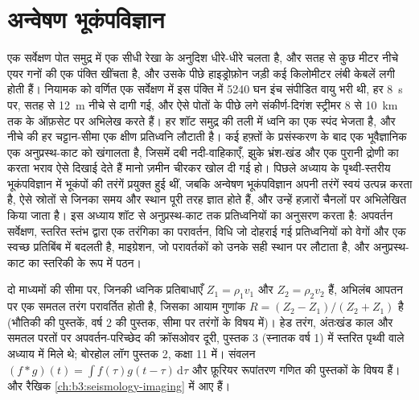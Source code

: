 \chapter{अन्वेषण भूकंपविज्ञान}\label{ch:b3:exploration-seismology}

एक सर्वेक्षण पोत समुद्र में एक सीधी रेखा के अनुदिश धीरे-धीरे चलता है, और सतह से
कुछ मीटर नीचे एयर गनों की एक पंक्ति खींचता है, और उसके पीछे
हाइड्रोफ़ोन जड़ी कई किलोमीटर लंबी केबलें लगी होती हैं।
नियामक को वर्णित एक सर्वेक्षण में इस पंक्ति में \num{5240} घन इंच संपीडित वायु भरी थी,
हर \qty{8}{s} पर, सतह से \qty{12}{m} नीचे से दागी गई, और ऐसे पोतों के पीछे लगे
संकीर्ण-दिगंश स्ट्रीमर 8 से \qty{10}{km} तक के ऑफ़सेट पर अभिलेख करते हैं।
हर शॉट समुद्र की तली में ध्वनि का एक स्पंद भेजता है, और नीचे की हर चट्टान-सीमा
एक क्षीण प्रतिध्वनि लौटाती है। कई हफ़्तों के प्रसंस्करण के बाद एक भूवैज्ञानिक
एक अनुप्रस्थ-काट को खंगालता है, जिसमें दबी नदी-वाहिकाएँ, झुके भ्रंश-खंड और
एक पुरानी द्रोणी का  करता भराव ऐसे दिखाई देते हैं मानो ज़मीन चीरकर खोल दी गई हो।
पिछले अध्याय के पृथ्वी-स्तरीय भूकंपविज्ञान में भूकंपों की तरंगें प्रयुक्त हुई थीं,
जबकि अन्वेषण भूकंपविज्ञान अपनी तरंगें स्वयं उत्पन्न करता है, ऐसे स्रोतों से जिनका समय और
स्थान पूरी तरह ज्ञात होते हैं, और उन्हें हज़ारों चैनलों पर अभिलेखित किया जाता है। इस
अध्याय शॉट से अनुप्रस्थ-काट तक प्रतिध्वनियों का अनुसरण करता है: अपवर्तन सर्वेक्षण,
स्तरित स्तंभ द्वारा एक तरंगिका का परावर्तन,  विधि
जो दोहराई गई प्रतिध्वनियों को वेगों और एक स्वच्छ प्रतिबिंब में बदलती है, माइग्रेशन, जो
परावर्तकों को उनके सही स्थान पर लौटाता है, और अनुप्रस्थ-काट का
स्तरिकी के रूप में पठन।

\begin{recall}
दो माध्यमों की सीमा पर, जिनकी ध्वनिक प्रतिबाधाएँ $Z_1 = \rho_1v_1$ और
$Z_2 = \rho_2v_2$ हैं, अभिलंब आपतन पर एक समतल तरंग परावर्तित होती है, जिसका
आयाम गुणांक $R = (Z_2 - Z_1)/(Z_2 + Z_1)$ है (भौतिकी की पुस्तकें, वर्ष 2
की पुस्तक, सीमा पर तरंगों के विषय में)। हेड तरंग, अंतःखंड काल और
समतल परतों पर अपवर्तन-परिच्छेद की क्रॉसओवर दूरी, पुस्तक 3 (स्नातक वर्ष 1) में
स्तरित पृथ्वी वाले अध्याय में मिले थे; बोरहोल लॉग पुस्तक 2,
कक्षा 11 में। संवलन $(f*g)(t) = \int f(\tau)g(t - \tau)\,\mathrm d\tau$
और फ़ूरियर रूपांतरण गणित की पुस्तकों के विषय हैं।  और
रैखिक  \cref{ch:b3:seismology-imaging} में आए हैं।
\end{recall}

